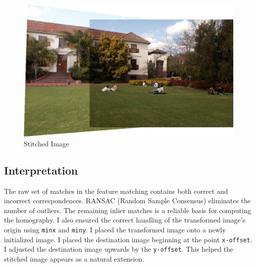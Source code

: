 \documentclass{article}
\begin{document}
\begin{figure}[H]
    \centering
    \includegraphics[width=\textwidth]{q4/output/stitched.jpg}
    \caption{Stitched Image}
\end{figure}
\subsection{Interpretation}
The raw set of matches in the feature matching contains both correct and incorrect correspondences.
RANSAC (Random Sample Consensus) eliminates the number of outliers. The remaining inlier matches is 
a reliable basis for computing the homography. I also ensured the correct handling of the transformed 
image's origin using \texttt{minx} and \texttt{miny}. I placed the transformed image onto a newly initialized image.
I placed the destination image beginning at the point \texttt{x-offset}. I adjusted the destination image 
upwards by the \texttt{y-offset}. This helped the stitched image appears as a natural extension.

\nocite{*}


\end{document}
